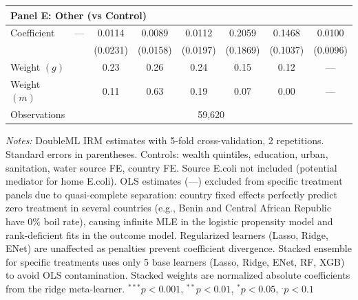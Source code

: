 \begin{table}[htbp]
\begin{tabular}{lccccccc}
\multicolumn{8}{l}{\textbf{Panel E: Other (vs Control)}} \\
\midrule
Coefficient & --- & 0.0114 & 0.0089 & 0.0112 & 0.2059 & 0.1468 & 0.0100 \\
 &  & (0.0231) & (0.0158) & (0.0197) & (0.1869) & (0.1037) & (0.0096) \\
Weight $(g)$ &  & 0.23 & 0.26 & 0.24 & 0.15 & 0.12 & — \\
Weight $(m)$ &  & 0.11 & 0.63 & 0.19 & 0.07 & 0.00 & — \\

\midrule
Observations & \multicolumn{7}{c}{59,620} \\
\bottomrule
\end{tabular}
\begin{minipage}{\textwidth}
\footnotesize
\textit{Notes:} DoubleML IRM estimates with 5-fold cross-validation, 2 repetitions. 
Standard errors in parentheses. 
Controls: wealth quintiles, education, urban, sanitation, water source FE, country FE. 
Source E.coli not included (potential mediator for home E.coli). 
OLS estimates (---) excluded from specific treatment panels due to quasi-complete separation: 
country fixed effects perfectly predict zero treatment in several countries (e.g., Benin and Central African Republic have 0\% boil rate), 
causing infinite MLE in the logistic propensity model and rank-deficient fits in the outcome model. 
Regularized learners (Lasso, Ridge, ENet) are unaffected as penalties prevent coefficient divergence. 
Stacked ensemble for specific treatments uses only 5 base learners (Lasso, Ridge, ENet, RF, XGB) to avoid OLS contamination. 
Stacked weights are normalized absolute coefficients from the ridge meta-learner. 
$^{***}p<0.001$, $^{**}p<0.01$, $^{*}p<0.05$, $^{.}p<0.1$
\end{minipage}
\end{table}
